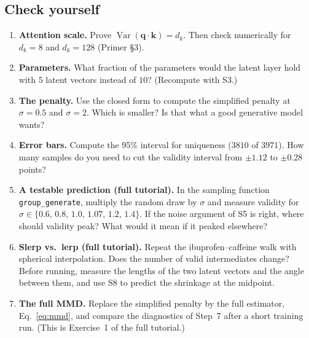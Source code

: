 \documentclass[11pt]{article}
\DeclareMathOperator{\Var}{Var}
\begin{document}
\subsection*{Check yourself}
\begin{enumerate}
  \item \textbf{Attention scale.} Prove $\Var(\bm q\cdot\bm k)=d_k$. Then check numerically for $d_k=8$ and $d_k=128$ (Primer \S3).
  \item \textbf{Parameters.} What fraction of the parameters would the latent layer hold with $5$ latent vectors instead of $10$? (Recompute with S3.)
  \item \textbf{The penalty.} Use the closed form to compute the simplified penalty at $\sigma=0.5$ and $\sigma=2$. Which is smaller? Is that what a good generative model wants?
  \item \textbf{Error bars.} Compute the 95\% interval for uniqueness ($3810$ of $3971$). How many samples do you need to cut the validity interval from $\pm1.12$ to $\pm0.28$ points?
  \item \textbf{A testable prediction (full tutorial).} In the sampling function \texttt{group\_generate}, multiply the random draw by $\sigma$ and measure validity for $\sigma\in\{0.6,\,0.8,\,1.0,\,1.07,\,1.2,\,1.4\}$. If the noise argument of S5 is right, where should validity peak? What would it mean if it peaked elsewhere?
  \item \textbf{Slerp vs.\ lerp (full tutorial).} Repeat the ibuprofen--caffeine walk with spherical interpolation. Does the number of valid intermediates change? Before running, measure the lengths of the two latent vectors and the angle between them, and use S8 to predict the shrinkage at the midpoint.
  \item \textbf{The full MMD.} Replace the simplified penalty by the full estimator, Eq.~\eqref{eq:mmd}, and compare the diagnostics of Step~7 after a short training run. (This is Exercise~1 of the full tutorial.)
\end{enumerate}
\end{document}
